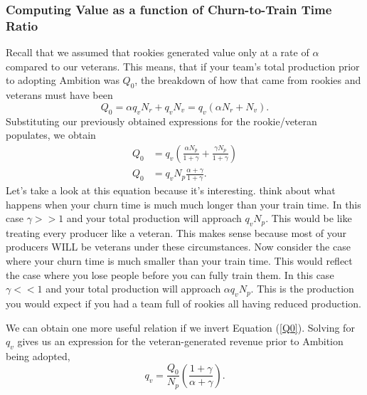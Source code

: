 \documentclass[paper=a4, fontsize=11pt abstract]{scrartcl}
\numberwithin{equation}{section}		%
\numberwithin{figure}{section}			%
\numberwithin{table}{section}				%
\begin{document}
\subsubsection{Computing Value as a function of Churn-to-Train Time Ratio}
Recall that we assumed that rookies generated value only at a rate of $\alpha$ compared to our veterans.  This means, that if your team's total production prior to adopting Ambition was $Q_0$, the breakdown of how that came from rookies and veterans must have been
\begin{equation}
    Q_0 = \alpha q_{v} N_r + q_{v} N_v = q_{v}\left(\alpha N_r + N_v\right).
\end{equation}
Substituting our previously obtained expressions for the rookie/veteran populates, we obtain
\begin{align}
    Q_0 &= q_{v}\left(\frac{\alpha N_p}{1 + \gamma} + \frac{\gamma N_p}{1 + \gamma}\right)  \\
    Q_0 &= q_{v} N_p\frac{\alpha + \gamma}{1 + \gamma} \label{Q0}.
\end{align}
Let's take a look at this equation because it's interesting.  think about what happens when your churn time is much much longer than your train time.  In this case $\gamma >> 1$ and your total production will approach $q_{v}N_p$. This would be like treating every producer like a veteran.  This makes sense because most of your producers WILL be veterans under these circumstances.  Now consider the case where your churn time is much smaller than your train time.  This would reflect the case where you lose people before you can fully train them.  In this case $\gamma << 1$ and your total production will approach $\alpha q_{v} N_p$.  This is the production you would expect if you had a team full of rookies all having reduced production.

We can obtain one more useful relation if we invert Equation (\ref{Q0}).  Solving for $q_{v}$ gives us an expression for the veteran-generated revenue prior to Ambition being adopted,
\begin{equation}
    q_{v} = \frac{Q_0}{N_p}\left(\frac{1 + \gamma}{\alpha + \gamma}\right).
\end{equation}
\end{document}
